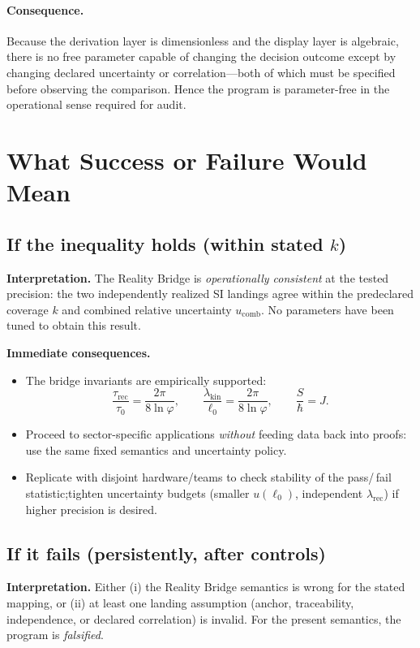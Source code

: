 \documentclass[11pt]{article}
\theoremstyle{plain}
\theoremstyle{definition}
\theoremstyle{remark}
\begin{document}
\paragraph{Consequence.}
Because the derivation layer is dimensionless and the display layer is algebraic, there is no free parameter capable of changing the decision outcome except by changing declared uncertainty or correlation—both of which must be specified before observing the comparison. Hence the program is parameter-free in the operational sense required for audit.

\section{What Success or Failure Would Mean}

\subsection*{If the inequality holds (within stated \(k\))}
\textbf{Interpretation.} The Reality Bridge is \emph{operationally consistent} at the tested precision: the two independently realized SI landings agree within the pre\-declared coverage \(k\) and combined relative uncertainty \(u_{\mathrm{comb}}\). No parameters have been tuned to obtain this result.

\textbf{Immediate consequences.}
\begin{itemize}
  \item The bridge invariants are empirically supported:
  \[
  \frac{\tau_{\mathrm{rec}}}{\tau_{0}}=\frac{2\pi}{8\ln\varphi},\qquad
  \frac{\lambda_{\mathrm{kin}}}{\ell_{0}}=\frac{2\pi}{8\ln\varphi},\qquad
  \frac{S}{\hbar}=J.
  \]
  \item Proceed to sector-specific applications \emph{without} feeding data back into proofs: use the same fixed semantics and uncertainty policy.
  \item Replicate with disjoint hardware/teams to check stability of the pass/\,fail statistic;\linebreak  tighten uncertainty budgets (smaller \(u(\ell_{0})\), independent \(\lambda_{\mathrm{rec}}\)) if higher precision is desired.
\end{itemize}

\subsection*{If it fails (persistently, after controls)}
\textbf{Interpretation.} Either (i) the Reality Bridge semantics is wrong for the stated mapping, or (ii) at least one landing assumption (anchor, traceability, independence, or declared correlation) is invalid. For the present semantics, the program is \emph{falsified}.
\end{document}
